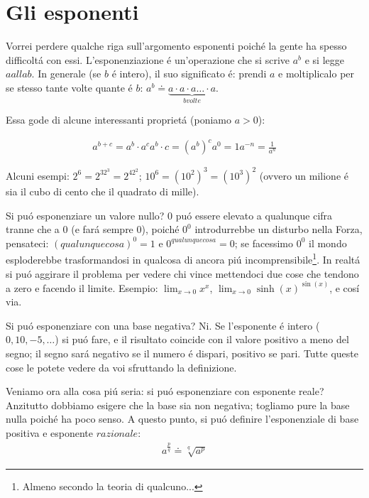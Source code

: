 \label{esponenti} \section{Gli esponenti}

Vorrei perdere qualche riga sull'argomento esponenti poich\'e la gente ha spesso difficolt\'a con essi.
L'esponenziazione \'e un'operazione che si scrive $a^b$ e si legge $a alla b$. In generale (se $b$ \'e intero),
il suo significato \'e: prendi $a$ e moltiplicalo per se stesso tante volte quante \'e $b$: $a^b \doteq \underbrace{a\cdot a \cdot a \ldots \cdot a}_{b volte}$.

Essa gode di alcune interessanti propriet\'a (poniamo $a > 0$):

\begin{eqnarray}
a^{b+c} = a^b \cdot a^c
a^b \cdot c = (a^b)^c
a^0 = 1
a^{-n}=\frac{1}{a^n}
\end{eqnarray}

Alcuni esempi: $2^6=2^32^3=2^42^2$; $10^6=(10^2)^3=(10^3)^2$ (ovvero un milione \'e sia il cubo di cento che il quadrato di mille). 

Si pu\'o esponenziare un valore nullo? $0$ pu\'o essere elevato a qualunque cifra tranne che a $0$ (e far\'a sempre 0), poich\'e $0^0$
introdurrebbe un disturbo nella Forza, pensateci: $(qualunque cosa)^0 = 1$ e $0^{qualunque cosa} = 0$; se facessimo $0^0$ il mondo
esploderebbe trasformandosi in qualcosa di ancora pi\'u incomprensibile\footnote{Almeno secondo la teoria di qualcuno...}. In realt\'a
si pu\'o aggirare il problema per vedere chi vince mettendoci due cose che tendono a zero e facendo il limite. Esempio:
$\lim_{x \rightarrow 0} x^x$, $\lim_{x \rightarrow 0} \sinh(x)^{\sin(x)}$, e cos\'i via.

Si pu\'o esponenziare con una base negativa? Ni. Se l'esponente \'e intero ($0,10,-5,\ldots$) si pu\'o fare, e il risultato
coincide con il valore positivo a meno del segno; il segno sar\'a negativo se il numero \'e dispari, positivo se pari. Tutte 
queste cose le potete vedere da voi sfruttando la definizione.

Veniamo ora alla cosa pi\'u seria: si pu\'o esponenziare con esponente reale? Anzitutto dobbiamo esigere che la base sia non negativa;
togliamo pure la base nulla poich\'e ha poco senso. A questo punto, si pu\'o definire l'esponenziale di base positiva e esponente $razionale$:
\begin{eqnarray}
a^{\frac{p}{q}} \doteq \sqrt[q]{a^p}
\end{eqnarray}

